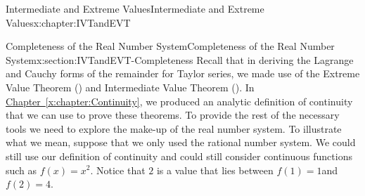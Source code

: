 \typeout{************************************************}
\typeout{************************************************}
%
\begin{chapterptx}{Intermediate and Extreme Values}{}{Intermediate and Extreme Values}{}{}{x:chapter:IVTandEVT}
	\typeout{************************************************}
	\typeout{************************************************}
	\begin{sectionptx}{Completeness of the Real Number System}{}{Completeness of the Real Number System}{}{}{x:section:IVTandEVT-Completeness}
		Recall that in deriving the Lagrange and Cauchy forms of the remainder for Taylor series, we made use of the Extreme Value Theorem () and Intermediate Value Theorem (). In \hyperref[x:chapter:Continuity]{Chapter~{\xreffont\ref{x:chapter:Continuity}}}, we produced an analytic definition of continuity that we can use to prove these theorems. To provide the rest of the necessary tools we need to explore the make-up of the real number system. To illustrate what we mean, suppose that we only used the rational number system. We could still use our definition of continuity and could still consider continuous functions such as \(f(x)=x^2\). Notice that \(2\) is a value that lies between \(f(1)=1\)and \(f(2)=4\).%
		\begin{image}{0.315}{0.37}{0.315}%

\end{image}
\end{sectionptx}
\end{chapterptx}
